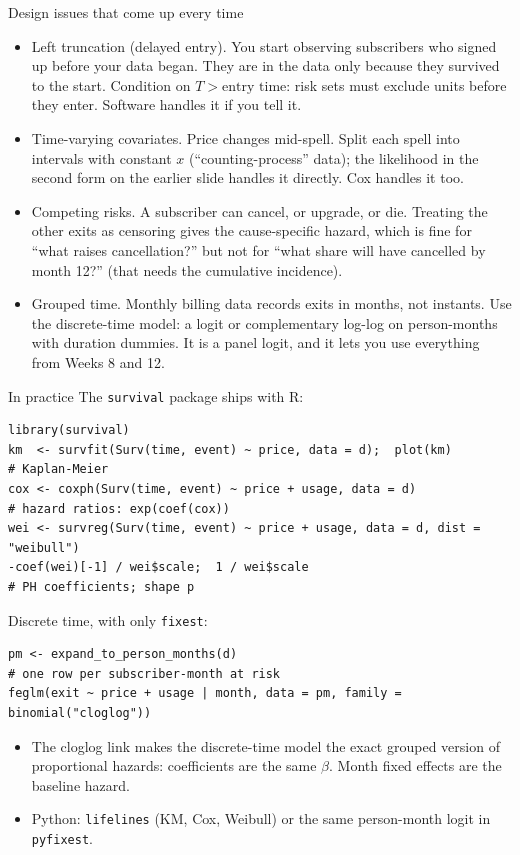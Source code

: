 \documentclass[aspectratio=169,11pt]{beamer}
\begin{document}
\begin{frame}{Design issues that come up every time}
\begin{itemize}
	\item \alert{Left truncation (delayed entry).} You start observing subscribers who signed up before
	your data began. They are in the data only because they survived to the start. Condition on
	$T > \text{entry time}$: risk sets must exclude units before they enter. Software handles it if you tell it.
	\medskip
	\item \alert{Time-varying covariates.} Price changes mid-spell. Split each spell into intervals with
	constant $x$ (``counting-process'' data); the likelihood in the second form on the earlier slide
	handles it directly. Cox handles it too.
	\medskip
	\item \alert{Competing risks.} A subscriber can cancel, or upgrade, or die. Treating the other exits
	as censoring gives the cause-specific hazard, which is fine for ``what raises cancellation?'' but
	not for ``what share will have cancelled by month 12?'' (that needs the cumulative incidence).
	\medskip
	\item \alert{Grouped time.} Monthly billing data records exits in months, not instants. Use the
	discrete-time model: a logit or complementary log-log on person-months with duration dummies.
	It is a panel logit, and it lets you use everything from Weeks 8 and 12.
\end{itemize}
\end{frame}


\begin{frame}[fragile]{In practice}
The \texttt{survival} package ships with R:
\begin{lstlisting}
library(survival)
km  <- survfit(Surv(time, event) ~ price, data = d);  plot(km)          # Kaplan-Meier
cox <- coxph(Surv(time, event) ~ price + usage, data = d)               # hazard ratios: exp(coef(cox))
wei <- survreg(Surv(time, event) ~ price + usage, data = d, dist = "weibull")
-coef(wei)[-1] / wei$scale;  1 / wei$scale                              # PH coefficients; shape p
\end{lstlisting}
Discrete time, with only \texttt{fixest}:
\begin{lstlisting}
pm <- expand_to_person_months(d)                                        # one row per subscriber-month at risk
feglm(exit ~ price + usage | month, data = pm, family = binomial("cloglog"))
\end{lstlisting}
\begin{itemize}
	\item The cloglog link makes the discrete-time model the exact grouped version of proportional
	hazards: coefficients are the same $\beta$. Month fixed effects are the baseline hazard.
	\item Python: \texttt{lifelines} (KM, Cox, Weibull) or the same person-month logit in \texttt{pyfixest}.
\end{itemize}
\end{frame}
\end{document}
